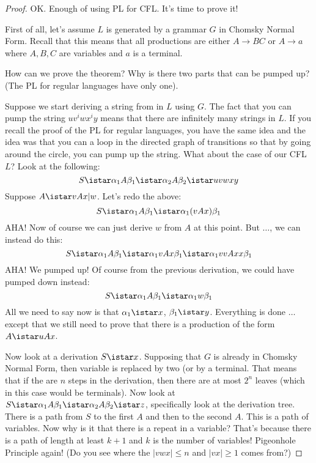 \newpage
\begin{proof}
OK. Enough of using PL for CFL. It's time to prove it!

First of all, let's assume $L$ is generated by a grammar $G$ in
Chomsky Normal Form. Recall that this means that all productions are
either $A \rightarrow BC$ or $A \rightarrow a$ where $A,B,C$ are
variables and $a$ is a terminal.

How can we prove the theorem? Why is there two parts that can be
pumped up? (The PL for regular languages have only one).

Suppose we start deriving a string from in $L$ using $G$. The fact
that you can pump the string $uv^iwx^iy$ means that there are
infinitely many strings in $L$. If you recall the proof of the PL
for regular languages, you have the same idea and the idea was that
you can a loop in the directed graph of transitions so that by going
around the circle, you can pump up the string. What about the case
of our CFL $L$? Look at the following:
\[
 S \istar \alpha_1 A \beta_1 \istar \alpha_2 A \beta_2 \istar uvwxy
\]
Suppose $A \istar vAx|w$. Let's redo the above:
\[
 S \istar \alpha_1 A \beta_1 \istar \alpha_1 (vAx) \beta_1
\]
AHA! Now of course we can just derive $w$ from $A$ at this point.
But $\ldots$, we can instead do this:
\[
 S \istar \alpha_1 A \beta_1 \istar \alpha_1 v A x\beta_1 \istar
 \alpha_1 vvA xx \beta_1
\]
AHA! We pumped up! Of course from the previous derivation, we could
have pumped down instead:
\[
 S \istar \alpha_1 A \beta_1 \istar \alpha_1 w \beta_1
\]
All we need to say now is that $\alpha_1 \istar x$, $\beta_1 \istar
y$. Everything is done $\ldots$ except that we still need to prove
that there is a production of the form $A \istar uAx$.

Now look at a derivation $S \istar x$. Supposing that $G$ is
already in Chomsky Normal Form, then variable is replaced by two
(or by a terminal. That means that if the are $n$ steps in the
derivation, then there are at most $2^n$ leaves (which in this
case would be terminals). Now look at $S \istar \alpha_1 A \beta_1
\istar \alpha_2 A \beta_2 \istar z$, specifically look at the
derivation tree. 
There is a path from $S$ to the first $A$ and
then to the second $A$. 
This is a path of variables. 
Now why is it that there is a repeat in a variable?
That's because there is a path of length at least $k + 1$ and $k$ is the
number of variables!
Pigeonhole Principle again!
(Do you see where the $|vwx| \leq n$ and $|vx| \geq 1$ comes from?)
\end{proof}
